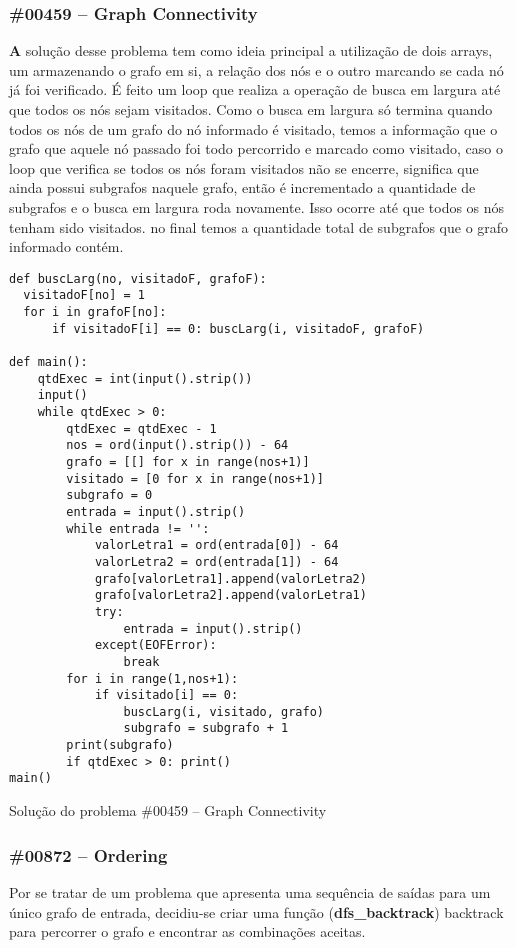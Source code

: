 \documentclass[a4paper,12pt]{scrartcl}
\begin{document}
\subsubsection{\#00459 – Graph Connectivity}
\textbf
A solução desse problema tem como ideia principal a utilização de dois arrays, um armazenando o grafo em si, a relação dos nós e o outro marcando se cada nó já foi verificado. É feito um loop que realiza a operação de busca em largura até que todos os nós sejam visitados. Como o busca em largura só termina quando todos os nós de um grafo do nó informado é visitado, temos a informação que o grafo que aquele nó passado foi todo percorrido e marcado como visitado, caso o loop que verifica se todos os nós foram visitados não se encerre, significa que ainda possui subgrafos naquele grafo, então é incrementado a quantidade de subgrafos e o busca em largura roda novamente. Isso ocorre até que todos os nós tenham sido visitados. no final temos a quantidade total de subgrafos que o grafo informado contém.

\begin{listing}[H]
\begin{verbatim}
def buscLarg(no, visitadoF, grafoF):
  visitadoF[no] = 1
  for i in grafoF[no]:
      if visitadoF[i] == 0: buscLarg(i, visitadoF, grafoF)

def main():
    qtdExec = int(input().strip())
    input()
    while qtdExec > 0:
        qtdExec = qtdExec - 1
        nos = ord(input().strip()) - 64
        grafo = [[] for x in range(nos+1)]
        visitado = [0 for x in range(nos+1)]
        subgrafo = 0
        entrada = input().strip()
        while entrada != '':
            valorLetra1 = ord(entrada[0]) - 64
            valorLetra2 = ord(entrada[1]) - 64
            grafo[valorLetra1].append(valorLetra2)
            grafo[valorLetra2].append(valorLetra1)
            try:
                entrada = input().strip()
            except(EOFError):
                break           
        for i in range(1,nos+1):
            if visitado[i] == 0:
                buscLarg(i, visitado, grafo)
                subgrafo = subgrafo + 1
        print(subgrafo)
        if qtdExec > 0: print()
main()
\end{verbatim}
\caption{\footnotesize{Solução do problema \#00459 – Graph Connectivity}}
\end{listing}

\subsubsection{\#00872 – Ordering}
Por se tratar de um problema que apresenta uma sequência de saídas para um único grafo de entrada, decidiu-se criar uma função (\textbf{dfs\_backtrack}) backtrack para percorrer o grafo e encontrar as combinações aceitas.
\end{document}

